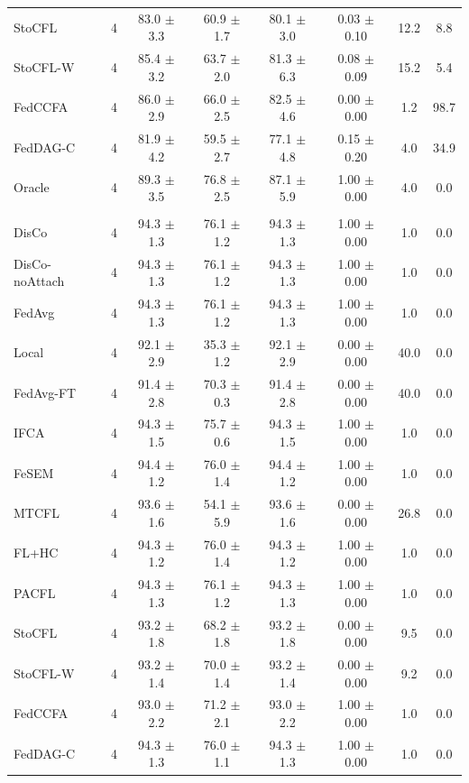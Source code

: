 {\begin{tabular}{l r c c c c c c}
StoCFL & 4 & 83.0 $\pm$ 3.3 & 60.9 $\pm$ 1.7 & 80.1 $\pm$ 3.0 & 0.03 $\pm$ 0.10 & 12.2 & 8.8 \\
StoCFL-W & 4 & 85.4 $\pm$ 3.2 & 63.7 $\pm$ 2.0 & 81.3 $\pm$ 6.3 & 0.08 $\pm$ 0.09 & 15.2 & 5.4 \\
FedCCFA & 4 & 86.0 $\pm$ 2.9 & 66.0 $\pm$ 2.5 & 82.5 $\pm$ 4.6 & 0.00 $\pm$ 0.00 & 1.2 & 98.7 \\
FedDAG-C & 4 & 81.9 $\pm$ 4.2 & 59.5 $\pm$ 2.7 & 77.1 $\pm$ 4.8 & 0.15 $\pm$ 0.20 & 4.0 & 34.9 \\
Oracle & 4 & 89.3 $\pm$ 3.5 & 76.8 $\pm$ 2.5 & 87.1 $\pm$ 5.9 & 1.00 $\pm$ 0.00 & 4.0 & 0.0 \\
\addlinespace
\multicolumn{8}{l}{\textit{Label skew only}} \\
DisCo & 4 & 94.3 $\pm$ 1.3 & 76.1 $\pm$ 1.2 & 94.3 $\pm$ 1.3 & 1.00 $\pm$ 0.00 & 1.0 & 0.0 \\
DisCo-noAttach & 4 & 94.3 $\pm$ 1.3 & 76.1 $\pm$ 1.2 & 94.3 $\pm$ 1.3 & 1.00 $\pm$ 0.00 & 1.0 & 0.0 \\
FedAvg & 4 & 94.3 $\pm$ 1.3 & 76.1 $\pm$ 1.2 & 94.3 $\pm$ 1.3 & 1.00 $\pm$ 0.00 & 1.0 & 0.0 \\
Local & 4 & 92.1 $\pm$ 2.9 & 35.3 $\pm$ 1.2 & 92.1 $\pm$ 2.9 & 0.00 $\pm$ 0.00 & 40.0 & 0.0 \\
FedAvg-FT & 4 & 91.4 $\pm$ 2.8 & 70.3 $\pm$ 0.3 & 91.4 $\pm$ 2.8 & 0.00 $\pm$ 0.00 & 40.0 & 0.0 \\
IFCA & 4 & 94.3 $\pm$ 1.5 & 75.7 $\pm$ 0.6 & 94.3 $\pm$ 1.5 & 1.00 $\pm$ 0.00 & 1.0 & 0.0 \\
FeSEM & 4 & 94.4 $\pm$ 1.2 & 76.0 $\pm$ 1.4 & 94.4 $\pm$ 1.2 & 1.00 $\pm$ 0.00 & 1.0 & 0.0 \\
MTCFL & 4 & 93.6 $\pm$ 1.6 & 54.1 $\pm$ 5.9 & 93.6 $\pm$ 1.6 & 0.00 $\pm$ 0.00 & 26.8 & 0.0 \\
FL+HC & 4 & 94.3 $\pm$ 1.2 & 76.0 $\pm$ 1.4 & 94.3 $\pm$ 1.2 & 1.00 $\pm$ 0.00 & 1.0 & 0.0 \\
PACFL & 4 & 94.3 $\pm$ 1.3 & 76.1 $\pm$ 1.2 & 94.3 $\pm$ 1.3 & 1.00 $\pm$ 0.00 & 1.0 & 0.0 \\
StoCFL & 4 & 93.2 $\pm$ 1.8 & 68.2 $\pm$ 1.8 & 93.2 $\pm$ 1.8 & 0.00 $\pm$ 0.00 & 9.5 & 0.0 \\
StoCFL-W & 4 & 93.2 $\pm$ 1.4 & 70.0 $\pm$ 1.4 & 93.2 $\pm$ 1.4 & 0.00 $\pm$ 0.00 & 9.2 & 0.0 \\
FedCCFA & 4 & 93.0 $\pm$ 2.2 & 71.2 $\pm$ 2.1 & 93.0 $\pm$ 2.2 & 1.00 $\pm$ 0.00 & 1.0 & 0.0 \\
FedDAG-C & 4 & 94.3 $\pm$ 1.3 & 76.0 $\pm$ 1.1 & 94.3 $\pm$ 1.3 & 1.00 $\pm$ 0.00 & 1.0 & 0.0 \\

\end{tabular}}
